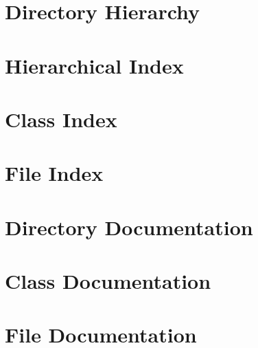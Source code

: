 \newlength{\tabulinesep}
\setlength{\tabulinesep}{1mm}
\chapter{Directory Hierarchy}

\chapter{Hierarchical Index}

\chapter{Class Index}

\chapter{File Index}

\chapter{Directory Documentation}


\chapter{Class Documentation}





\chapter{File Documentation}










  \backmatter
  \newpage
  \clearemptydoublepage
  \printindex

